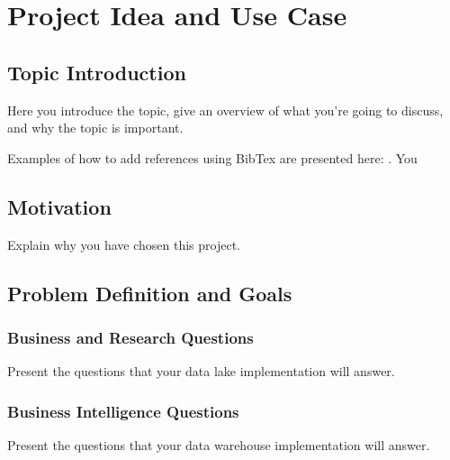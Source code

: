 \cleardoublepage%
\chapter{\label{chap:intro}Project Idea and Use Case}%
 

\section{\label{sec:intro_topic}Topic Introduction}%

Here you introduce the topic, give an overview of what you’re going to discuss, and why the topic is important. 


Examples of how to add references using BibTex are presented here: \cite{texbook,latex:companion, latex2e, knuth:1984,lesk:1977}. You  

\section{\label{sec:intro_motivation}Motivation}%

Explain why you have chosen this project.

\section{\label{sec:intro_problemdefinition}Problem Definition and Goals}


\subsection{\label{sec:intro_brquestions}Business and Research Questions}

Present the questions that your data lake implementation will answer. 


\subsection{\label{sec:intro_biquestions}Business Intelligence Questions}

Present the questions that your data warehouse implementation will answer.
